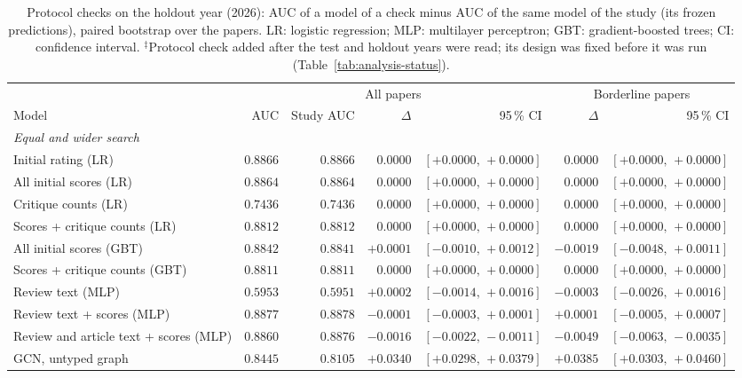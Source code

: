\begin{table}[t]
\centering
\footnotesize
\setlength{\tabcolsep}{4pt}
\caption{Protocol checks on the holdout year (2026): AUC of a model of a check minus AUC of the same model of the study (its frozen predictions), paired bootstrap over the papers. LR: logistic regression; MLP: multilayer perceptron; GBT: gradient-boosted trees; CI: confidence interval. $^{\ddagger}$Protocol check added after the test and holdout years were read; its design was fixed before it was run (Table~\ref{tab:analysis-status}).}
\label{tab:protocol-vs-study-holdout}
\begin{tabular}{@{}lrrrrrr@{}}
\toprule
 & \multicolumn{4}{c}{All papers} & \multicolumn{2}{c}{Borderline papers} \\
\cmidrule(lr){2-5} \cmidrule(lr){6-7}
Model & AUC & Study AUC & $\Delta$ & 95\,\% CI & $\Delta$ & 95\,\% CI \\
\midrule
\multicolumn{7}{l}{\emph{Equal and wider search}} \\
Initial rating (LR) & $0.8866$ & $0.8866$ & $0.0000$ & $[+0.0000,\,+0.0000]$ & $0.0000$ & $[+0.0000,\,+0.0000]$ \\
All initial scores (LR) & $0.8864$ & $0.8864$ & $0.0000$ & $[+0.0000,\,+0.0000]$ & $0.0000$ & $[+0.0000,\,+0.0000]$ \\
Critique counts (LR) & $0.7436$ & $0.7436$ & $0.0000$ & $[+0.0000,\,+0.0000]$ & $0.0000$ & $[+0.0000,\,+0.0000]$ \\
Scores + critique counts (LR) & $0.8812$ & $0.8812$ & $0.0000$ & $[+0.0000,\,+0.0000]$ & $0.0000$ & $[+0.0000,\,+0.0000]$ \\
All initial scores (GBT) & $0.8842$ & $0.8841$ & $+0.0001$ & $[-0.0010,\,+0.0012]$ & $-0.0019$ & $[-0.0048,\,+0.0011]$ \\
Scores + critique counts (GBT) & $0.8811$ & $0.8811$ & $0.0000$ & $[+0.0000,\,+0.0000]$ & $0.0000$ & $[+0.0000,\,+0.0000]$ \\
Review text (MLP) & $0.5953$ & $0.5951$ & $+0.0002$ & $[-0.0014,\,+0.0016]$ & $-0.0003$ & $[-0.0026,\,+0.0016]$ \\
Review text + scores (MLP) & $0.8877$ & $0.8878$ & $-0.0001$ & $[-0.0003,\,+0.0001]$ & $+0.0001$ & $[-0.0005,\,+0.0007]$ \\
Review and article text + scores (MLP) & $0.8860$ & $0.8876$ & $-0.0016$ & $[-0.0022,\,-0.0011]$ & $-0.0049$ & $[-0.0063,\,-0.0035]$ \\
GCN, untyped graph & $0.8445$ & $0.8105$ & $+0.0340$ & $[+0.0298,\,+0.0379]$ & $+0.0385$ & $[+0.0303,\,+0.0460]$ \\

\end{tabular}
\end{table}
